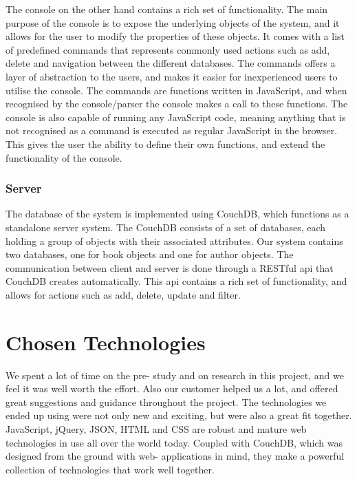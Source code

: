 The console on the other hand contains a rich set of functionality. The main purpose of the console is to expose the underlying objects of the system, and it allows for the user to modify the properties of these objects. It comes with a list of predefined commands that represents commonly used actions such as add, delete and navigation between the different databases. The commands offers a layer of abstraction to the users, and makes it easier for inexperienced users to utilise the console. The commands are functions written in JavaScript, and when recognised by the console/parser the console makes a call to these functions. The console is also capable of running any JavaScript code, meaning anything that is not recognised as a command is executed as regular JavaScript in the browser. This gives the user the ability to define their own functions, and extend the functionality of the console.

\subsubsection{Server}
The database of the system is implemented using CouchDB, which functions as a standalone server system. The CouchDB consists of a set of databases, each holding a group of objects with their associated attributes. Our system contains two databases, one for book objects and one for author objects. The communication between client and server is done through a RESTful api that CouchDB creates automatically. This api contains a rich set of functionality, and allows for actions such as add, delete, update and filter. 

\section{Chosen Technologies}
We spent a lot of time on the pre- study and on research in this project, and we feel it was well worth the effort. Also our customer helped us a lot, and offered great suggestions and guidance throughout the project. The technologies we ended up using were not only new and exciting, but were also a great fit together. JavaScript, jQuery, JSON, HTML and CSS are robust and mature web technologies in use all over the world today. Coupled with CouchDB, which was designed from the ground with web- applications in mind, they make a powerful collection of technologies that work well together.

